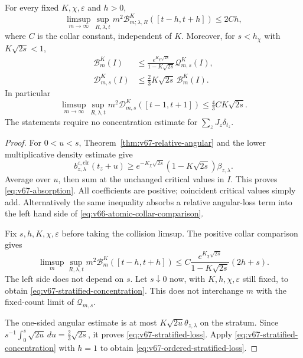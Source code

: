 \begin{theorem}
\label{thm:v67-stratified-trace}
For every fixed $K,\chi,\varepsilon$ and $h>0$,
\begin{equation}\label{eq:v67-stratified-concentration}
 \limsup_{m\to\infty}\sup_{R,\lambda,t}
       m^2\mathcal B^K_{m;\lambda,R}([t-h,t+h])\le2Ch,
\end{equation}
where $C$ is the collar constant, independent of $K$.
Moreover, for $s<h_\chi$ with $K\sqrt{2s}<1$,
\begin{align}
 \mathcal B^K_m(I)
 &\le\frac{e^{K_\chi\sqrt{2s}}}{1-K\sqrt{2s}}
                            \mathcal Q^K_{m,s}(I),       \label{eq:v67-absorption}\\
 \mathcal D^K_{m,s}(I)
 &\le\tfrac23K\sqrt{2s}\,\mathcal B^K_m(I).             \label{eq:v67-stratified-loss}
\end{align}
In particular
\begin{equation}\label{eq:v67-ordered-stratified-loss}
 \limsup_{m\to\infty}\sup_{R,\lambda,t}
      m^2\mathcal D^K_{m,s}([t-1,t+1])
                  \le\tfrac43 C K\sqrt{2s}.
\end{equation}
The statements require no concentration estimate for
$\sum_zJ_z\delta_{t_z}$.
\end{theorem}
\begin{proof}
For $0<u<s$, Theorem~\ref{thm:v67-relative-angular} and the lower
multiplicative density estimate give
\[
 b_{z,\lambda}^{\varepsilon,\mathrm{clr}}(t_z+u)
  \ge e^{-K_\chi\sqrt{2s}}(1-K\sqrt{2s})\beta_{z,\lambda}.
\]
Average over $u$, then sum at the unchanged critical values in $I$.
This proves \eqref{eq:v67-absorption}. All coefficients are positive;
coincident critical values simply add. Alternatively the same inequality
absorbs a relative angular-loss term into the left hand side of
\eqref{eq:v66-atomic-collar-comparison}.

Fix $s,h,K,\chi,\varepsilon$ before taking the collision limsup.
The positive collar comparison gives
\[
 \limsup_m\sup_{R,\lambda,t}m^2\mathcal B^K_m([t-h,t+h])
 \le C\frac{e^{K_\chi\sqrt{2s}}}{1-K\sqrt{2s}}(2h+s).
\]
The left side does not depend on $s$. Let $s\downarrow0$ now, with
$K,h,\chi,\varepsilon$ still fixed, to obtain
\eqref{eq:v67-stratified-concentration}. This does not interchange
$m$ with the fixed-count limit of $\mathcal Q_{m,s}$.

The one-sided angular estimate is at most
$K\sqrt{2u}\theta_{z,\lambda}$ on the stratum. Since
$s^{-1}\int_0^s\sqrt{2u}\,du=\tfrac23\sqrt{2s}$,
it proves \eqref{eq:v67-stratified-loss}. Apply
\eqref{eq:v67-stratified-concentration} with $h=1$ to obtain
\eqref{eq:v67-ordered-stratified-loss}.
\end{proof}


